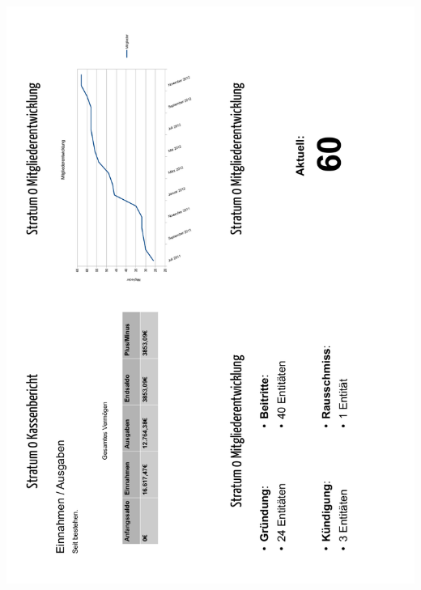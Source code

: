 \documentclass[a4paper,12pt]{scrartcl}
\begin{document}
\includegraphics[width=\textwidth]{images/Kassenbericht_2012_2.pdf}
\end{document}
